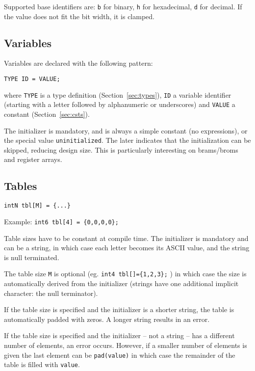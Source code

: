 \documentclass[a4]{article}
\begin{document}
Supported base identifiers are: \texttt{b} for binary, \texttt{h} for hexadecimal, \texttt{d} for decimal. If the value does not fit the bit width, it is clamped.


\subsection{Variables}

Variables are declared with the following pattern:

\texttt{TYPE ID = VALUE;}

\noindent where \texttt{TYPE} is a type definition (Section~\ref{sec:types}), \texttt{ID} a variable identifier (starting with a letter followed by alphanumeric or underscores) and \texttt{VALUE} a constant (Section~\ref{sec:csts}).

The initializer is mandatory, and is always a simple constant (no expressions), or the special
value \texttt{uninitialized}. The later indicates that the initialization can be skipped, reducing design size. This is particularly interesting on brams/broms and register arrays.

\subsection{Tables}

\texttt{intN tbl[M] = \{...\} }

\noindent Example:  \texttt{int6 tbl[4] = \{0,0,0,0\};}

Table sizes have to be constant at compile time. The initializer is mandatory and can be a string, in which case each letter becomes its ASCII value, and the string is null terminated. 

The table size \texttt{M} is optional (eg. \texttt{int4 tbl[]=\{1,2,3\};} ) in which case the size is automatically derived from the initializer (strings have one additional implicit character: the null terminator).

If the table size is specified and the initializer is a shorter string, the table is automatically padded with zeros. A longer string results in an error. 

If the table size is specified and the initializer -- not a string -- has a different number of elements, an error occurs. However, if a smaller number of elements is given the last element can be \texttt{pad(value)} in which case the remainder of the table is filled with \texttt{value}.
\end{document}
